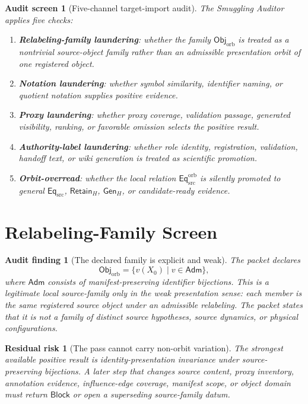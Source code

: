 \documentclass[11pt]{article}
\newcommand{\ObjOrb}{\mathsf{Obj}_{\mathrm{orb}}}
\newcommand{\Adm}{\mathsf{Adm}}
\newcommand{\EqSrc}{\mathsf{Eq}_{\mathrm{src}}}
\newcommand{\EqOrb}{\mathsf{Eq}_{\mathrm{src}}^{\mathrm{orb}}}
\newcommand{\GenH}{\mathsf{Gen}_{H}}
\newcommand{\RetainH}{\mathsf{Retain}_{H}}
\newcommand{\Block}{\mathsf{Block}}
\newtheorem{auditscreen}{Audit screen}
\newtheorem{auditfinding}{Audit finding}
\newtheorem{residualrisk}{Residual risk}
\begin{document}
\begin{auditscreen}[Five-channel target-import audit]
The Smuggling Auditor applies five checks:
\begin{enumerate}
    \item \textbf{Relabeling-family laundering}: whether the family
    \(\ObjOrb\) is treated as a nontrivial source-object family rather
    than an admissible presentation orbit of one registered object.
    \item \textbf{Notation laundering}: whether symbol similarity,
    identifier naming, or quotient notation supplies positive evidence.
    \item \textbf{Proxy laundering}: whether proxy coverage, validation
    passage, generated visibility, ranking, or favorable omission selects
    the positive result.
    \item \textbf{Authority-label laundering}: whether role identity,
    registration, validation, handoff text, or wiki generation is treated
    as scientific promotion.
    \item \textbf{Orbit-overread}: whether the local relation
    \(\EqOrb\) is silently promoted to general \(\EqSrc\),
    \(\RetainH\), \(\GenH\), or candidate-ready evidence.
\end{enumerate}
\end{auditscreen}

\section{Relabeling-Family Screen}

\begin{auditfinding}[The declared family is explicit and weak]
The packet declares
\[
    \ObjOrb=\{v(X_{0})\mid v\in\Adm\},
\]
where \(\Adm\) consists of manifest-preserving identifier bijections.
This is a legitimate local source-family only in the weak presentation
sense: each member is the same registered source object under an
admissible relabeling. The packet states that it is not a family of
distinct source hypotheses, source dynamics, or physical configurations.
\end{auditfinding}

\begin{residualrisk}[The pass cannot carry non-orbit variation]
The strongest available positive result is identity-presentation
invariance under source-preserving bijections. A later step that changes
source content, proxy inventory, annotation evidence, influence-edge
coverage, manifest scope, or object domain must return \(\Block\) or open
a superseding source-family datum.
\end{residualrisk}
\end{document}
